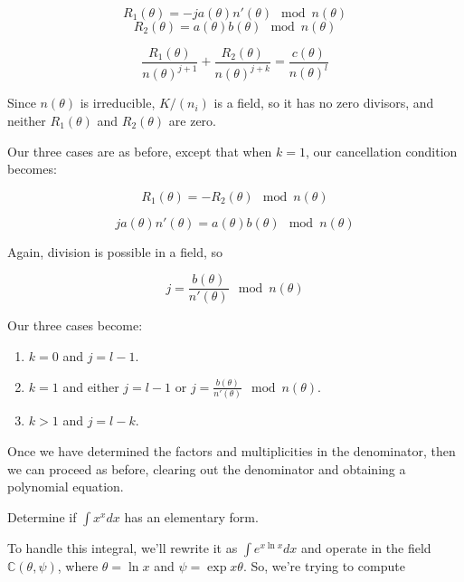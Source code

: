 

$$R_1(\theta) = -ja(\theta)n'(\theta) \mod n(\theta)$$
$$R_2(\theta) = a(\theta)b(\theta) \mod n(\theta)$$



$$\frac{R_1(\theta)}{n(\theta)^{j+1}} + \frac{R_2(\theta)}{n(\theta)^{j+k}} = \frac{c(\theta)}{n(\theta)^l}$$


Since $n(\theta)$ is irreducible, $K/(n_i)$ is a field, so it has no zero divisors, and
neither $R_1(\theta)$ and $R_2(\theta)$ are zero.

Our three cases are as before, except that when $k=1$, our cancellation condition becomes:

$$R_1(\theta) = -R_2(\theta) \mod n(\theta)$$

$$ja(\theta)n'(\theta) = a(\theta)b(\theta) \mod n(\theta)$$

Again, division is possible in a field, so

$$j = \frac{b(\theta)}{n'(\theta)} \mod n(\theta)$$

Our three cases become:

\begin{enumerate}

\item $k=0$ and $j = l-1$.

\item $k=1$ and either $j=l-1$ or $j = \frac{b(\theta)}{n'(\theta)} \mod n(\theta)$.

\item $k>1$ and $j=l-k$.

\end{enumerate}

Once we have determined the factors and multiplicities in the denominator,
then we can proceed as before, clearing out the denominator and obtaining
a polynomial equation.

\vfill\eject

\example Determine if $\int x^x dx$ has an elementary form.

To handle this integral, we'll rewrite it as $\int e^{x \ln x} dx$
and operate in the field ${\mathbb C}(\theta, \psi)$, where
$\theta = \ln x$ and $\psi = \exp x\theta$.  So, we're
trying to compute

